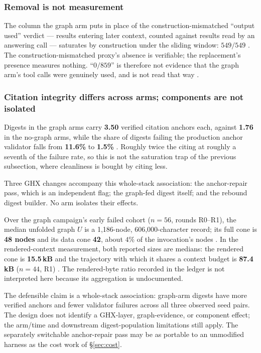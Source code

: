 \subsubsection*{Removal is not measurement}

The column the graph arm puts in place of the construction-mismatched ``output used''
verdict --- results entering later context, counted against results read
by an answering call --- saturates by construction under the sliding
window: $549/549$ . The construction-mismatched proxy's absence is verifiable; the
replacement's presence measures nothing. ``$0/859$'' is therefore not
evidence that the graph arm's tool calls were genuinely used, and is not read that way .

\subsubsection*{Citation integrity differs across arms; components are not isolated}

Digests in the graph arms carry \textbf{3.50} verified citation anchors
each, against \textbf{1.76} in the no-graph arms, while the share of
digests failing the production anchor validator falls from \textbf{11.6\%}
to \textbf{1.5\%} . Roughly twice the citing at roughly a seventh of
the failure rate, so this is not the saturation trap of the previous
subsection, where cleanliness is bought by citing less.

Three GHX changes accompany this whole-stack association: the
anchor-repair pass, which is an independent flag; the graph-fed digest
itself; and the rebound digest builder. No arm isolates their effects.

Over the graph campaign's early failed cohort ($n{=}56$, rounds R0--R1),
the median unfolded graph $U$ is a 1{,}186-node, 606{,}000-character record;
its full cone is \textbf{48 nodes} and its data cone \textbf{42}, about
$4\%$ of the invocation's nodes . In the rendered-context measurement, both reported
sizes are medians: the rendered cone is \textbf{15.5\,kB} and the trajectory
with which it shares a context budget is \textbf{87.4\,kB} ($n{=}44$, R1)
. The rendered-byte ratio recorded in the ledger is not interpreted
here because its aggregation is undocumented.

The defensible claim is a whole-stack association: graph-arm digests have
more verified anchors and fewer validator failures across all three observed
seed pairs. The design does not identify a GHX-layer, graph-evidence, or
component effect; the arm/time and downstream digest-population limitations
still apply. The separately switchable anchor-repair
pass may be as portable to an unmodified harness as the cost work of
\S\ref{sec:cost}.


